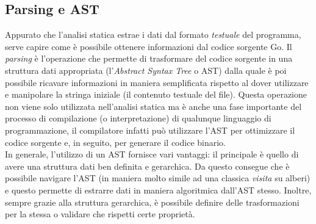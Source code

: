 \subsection{Parsing e AST}
Appurato che l'analisi statica estrae i dati dal formato \emph{testuale} del programma, serve capire come è possibile ottenere informazioni dal codice sorgente Go. Il \emph{parsing} è l'operazione che permette di trasformare del codice sorgente in una struttura dati appropriata (l'\emph{Abstract Syntax Tree} o AST\cite{Abstract_Syntax_Tree}) dalla quale è poi possibile ricavare informazioni in maniera semplificata rispetto al dover utilizzare e manipolare la stringa iniziale (il contenuto testuale del file). Questa operazione non viene solo utilizzata nell'analisi statica ma è anche una fase importante del processo di compilazione (o interpretazione) di qualunque linguaggio di programmazione, il compilatore infatti può utilizzare l'AST per ottimizzare il codice sorgente e, in seguito, per generare il codice binario.\\
In generale, l'utilizzo di un AST fornisce vari vantaggi: il principale è quello di avere una struttura dati ben definita e gerarchica. Da questo consegue che è possibile navigare l'AST (in maniera molto simile ad una classica \emph{visita} su alberi) e questo permette di estrarre dati in maniera algoritmica dall'AST stesso. Inoltre, sempre grazie alla struttura gerarchica, è possibile definire delle trasformazioni per la stessa o validare che rispetti certe proprietà.
